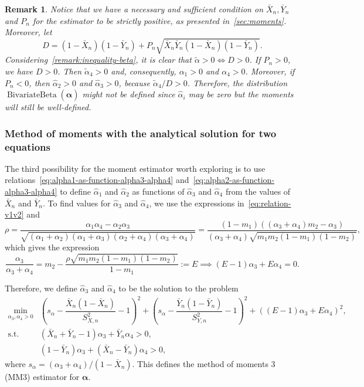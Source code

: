 \documentclass[a4paper, notitlepage, 10pt]{article}
\newcommand{\parameter}{\boldsymbol{\alpha}}
\newtheorem{remark}{Remark}[]
\theoremstyle{definition}
\begin{document}
\begin{remark}
    Notice that we have a necessary and sufficient condition on $\bar{X}_n, \bar{Y}_n$ and $P_n$ for the estimator  to be strictly positive, as presented in~\autoref{sec:moments}.
    Moreover, let  
    \[
    D = (1-\bar{X}_n)(1-\bar{Y}_n) + P_n\sqrt{\bar{X}_n\bar{Y}_n(1-\bar{X}_n)(1-\bar{Y}_n)}.
    \]
    Considering~\autoref{remark:inequality-beta}, it is clear that $\tilde{\alpha} > 0 \iff D > 0$. 
    If $P_n > 0$, we have $D > 0$. 
    Then $\tilde{\alpha}_4 > 0$ and, consequently, $\alpha_1 > 0$ and $\alpha_4 > 0$. 
    Moreover, if $P_n < 0$, then $\hat{\alpha}_2 > 0$ and $\hat{\alpha}_3 >0$, because $\tilde{\alpha}_4/D > 0$. 
    Therefore, the distribution $\operatorname{BivariateBeta}(\hat{\boldsymbol{\alpha}})$ might not be defined since $\hat{\alpha}_i$ may be zero but the moments will still be well-defined.
\end{remark}    

\subsubsection*{Method of moments with the analytical solution for two equations}

The third possibility for the moment estimator worth exploring is to use relations~\eqref{eq:alpha1-as-function-alpha3-alpha4} and~\eqref{eq:alpha2-as-function-alpha3-alpha4} to define $\hat{\alpha}_1$ and $\hat{\alpha}_2$ as functions of $\hat{\alpha}_3$ and $\hat{\alpha}_4$ from the values of $\bar{X}_n$ and $\bar{Y}_n$.
To find values for $\hat{\alpha}_3$ and $\hat{\alpha}_4$, we use the expressions in~\eqref{eq:relation-v1v2} and 
\[
\rho = \frac{\alpha_1\alpha_4 - \alpha_2\alpha_3}{\sqrt{(\alpha_1+\alpha_2)(\alpha_1+\alpha_3)(\alpha_2+\alpha_4)(\alpha_3+\alpha_4)}} = \frac{(1-m_1)((\alpha_3+\alpha_4)m_2 - \alpha_3)}{(\alpha_3+\alpha_4)\sqrt{m_1m_2(1-m_1)(1-m_2)}},
\]
which gives the expression
\[
\frac{\alpha_3}{\alpha_3 + \alpha_4} = m_2 -  \frac{\rho\sqrt{m_1m_2(1-m_1)(1-m_2)}}{1-m_1} := E \implies (E-1)\alpha_3 + E\alpha_4 = 0.
\]

Therefore, we define $\hat{\alpha}_3$ and $\hat{\alpha}_4$ to be the solution to the problem 
\begin{equation}
    \label{eq:minimisation-mm3}
    \begin{split}
            \min_{\alpha_3, \alpha_4 > 0} &{\left(s_{\alpha} - \dfrac{\bar{X}_n(1 - \bar{X}_n)}{S_{X,n}^2} - 1\right)}^2 + {\left(s_{\alpha} - \dfrac{\bar{Y}_n(1 - \bar{Y}_n)}{S_{Y,n}^2}-1\right)}^2 + {((E-1)\alpha_3 + E\alpha_4)}^2, \\
            \text{s.t. } &(\bar{X}_n + \bar{Y}_n - 1)\alpha_3 + \bar{Y}_n \alpha_4 > 0, \\
            &(1 - \bar{Y}_n)\alpha_3 + (\bar{X}_n - \bar{Y}_n)\alpha_4 > 0,
    \end{split}
\end{equation}
where $s_{\alpha} = (\alpha_3 + \alpha_4)/(1 - \bar{X}_n)$.
This defines the method of moments 3 (MM3) estimator for $\parameter$.
\end{document}
